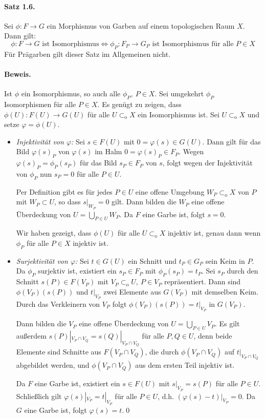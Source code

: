 \paragraph{Satz 1.6.}\label{1.6} Sei $\phi:F\to G$ ein Morphismus von Garben auf einem topologischen Raum $X$. Dann gilt:
\[\phi:F\to G\text{ ist Isomorphismus}\iff \phi_P:F_P\to G_P\text{ ist Isomorphismus für alle }P\in X \]
Für Prägarben gilt dieser Satz im Allgemeinen nicht.

\paragraph{Beweis.} Ist $\phi$ ein Isomorphismus, so auch alle $\phi_P,\ P\in X$. Sei umgekehrt $\phi_P$ Isomorphismen für alle $P\in X$. Es genügt zu zeigen, dass $\phi(U):F(U)\to G(U)$ für alle $U\subset_\text{o}X$ ein Isomorphismus ist. Sei $U\subset_\text{o}X$ und setze $\varphi=\phi(U)$.
\begin{itemize}
\item \textit{Injektivität von $\varphi$:} Sei $s\in F(U)$ mit $0=\varphi(s)\in G(U)$. Dann gilt für das Bild $\varphi(s)_P$ von $\varphi(s)$ im Halm $0=\varphi(s)_P\in F_P$. Wegen $\varphi(s)_P=\phi_P(s_P)$ für das Bild $s_P\in F_P$ von $s$, folgt wegen der Injektivität von $\phi_P$ nun $s_P=0$ für alle $P\in U$.

Per Definition gibt es für jedes $P\in U$ eine offene Umgebung $W_P\subset_\text{o}X$ von $P$ mit $W_P\subset U$, so dass $s|_{W_P}=0$ gilt. Dann bilden die $W_P$ eine offene Überdeckung von $U=\bigcup_{P\in U}W_P$. Da $F$ eine Garbe ist, folgt $s=0$.

Wir haben gezeigt, dass $\phi(U)$ für alle $U\subset_\text{o}X$ injektiv ist, genau dann wenn $\phi_P$ für alle $P\in X$ injektiv ist.
\item \textit{Surjektivität von $\varphi$:} Sei $t\in G(U)$ ein Schnitt und $t_P\in G_P$ sein Keim in $P$. Da $\phi_P$ surjektiv ist, existiert ein $s_P\in F_P$ mit $\phi_P(s_P)=t_P$. Sei $s_P$ durch den Schnitt $s(P)\in F(V_P)$ mit $V_P\subset_\text{o}U,\ P\in V_P$ repräsentiert. Dann sind $\phi(V_P)(s(P))$ und $t|_{V_P}$ zwei Elemente aus $G(V_P)$ mit demselben Keim. Durch das Verkleinern von $V_P$ folgt $\phi(V_P)(s(P))=t|_{V_P}$ in $G(V_P)$.

Dann bilden die $V_P$ eine offene Überdeckung von $U=\bigcup_{P\in U}V_P$. Es gilt außerdem $s(P)|_{V_P\cap V_Q}=s(Q)|_{V_P\cap V_Q}$ für alle $P,Q\in U$, denn beide Elemente sind Schnitte aus $F(V_P\cap V_Q)$, die durch $\phi(V_P\cap V_Q)$ auf $t|_{V_P\cap V_Q}$ abgebildet werden, und $\phi(V_P\cap V_Q)$ aus dem ersten Teil injektiv ist.

Da $F$ eine Garbe ist, existiert ein $s\in F(U)$ mit $s|_{V_P}=s(P)$ für alle $P\in U$. Schließlich gilt $\varphi(s)|_{V_P}=t|_{V_P}$ für alle $P\in U$, d.h. $(\varphi(s)-t)|_{V_P}=0$. Da $G$ eine Garbe ist, folgt $\varphi(s)=t$.\qed
\end{itemize}


